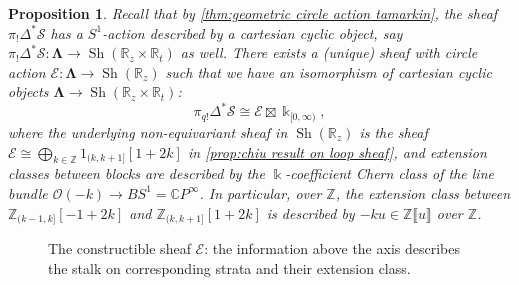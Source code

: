 \documentclass[11pt]{amsart}
\numberwithin{equation}{section}
\theoremstyle{plain}
\newtheorem{Prop}[prop]{Proposition}
\theoremstyle{definition}
\theoremstyle{remark}
\newcommand{\bC} { {\mathbb{C}}}
\newcommand{\bZ} { {\mathbb{Z}}}
\newcommand{\bR} { {\mathbb{R}}}
\newcommand{\cE} { {\mathcal{E}}}
\newcommand{\fpw}[1]{{\llbracket #1\rrbracket}}
\newcommand{\Sh} { {\operatorname{Sh}}}
\begin{document}
\begin{Prop}\label{prop:chiu result on loop sheaf equiv} Recall that by \autoref{thm:geometric circle action tamarkin}, the sheaf $\pi_!\Delta^*\mathcal{S}$ has a $S^1$-action described by a cartesian cyclic object, say $\pi_!\Delta^*\mathcal{S}:\boldsymbol{\Lambda} \to \Sh(\bR_z\times \bR_t)$ as well. There exists a (unique) sheaf with circle action ${\mathcal{E}}: \boldsymbol{\Lambda} \to \Sh(\bR_z)$ such that we have an isomorphism of cartesian cyclic objects $\boldsymbol{\Lambda} \to \Sh(\bR_z\times \bR_t)$:
\begin{equation}\label{loop sheaf of GF model of rotation equi}
\pi_{q!}\Delta^{*} \mathcal{S} \cong \cE \boxtimes {\Bbbk }_{[0,\infty)},   
\end{equation}
where the underlying non-equivariant sheaf in $\Sh(\bR_z)$ is the sheaf $\cE\cong  \bigoplus_{k\in \bZ}1_{(k,k+1]}[1+2k]$ in \autoref{prop:chiu result on loop sheaf}, and extension classes between blocks are described by the $\Bbbk$-coefficient Chern class of the line bundle $\mathcal{O} (-k) \to BS^1=\bC P^\infty$. In particular, over $\bZ$, the extension class between $\bZ_{(k-1,k]}[-1+2k]$ and $\bZ_{(k,k+1]}[1+2k]$ is described by $-ku\in \bZ\fpw{u}$ over $\bZ$.
\end{Prop}
\begin{figure}[htbp]
    \centering
{}
    \caption{The constructible sheaf $\cE$: the information above the axis describes the stalk on corresponding strata and their extension class.}
    \label{fig: construction of E}
\end{figure}
\end{document}
